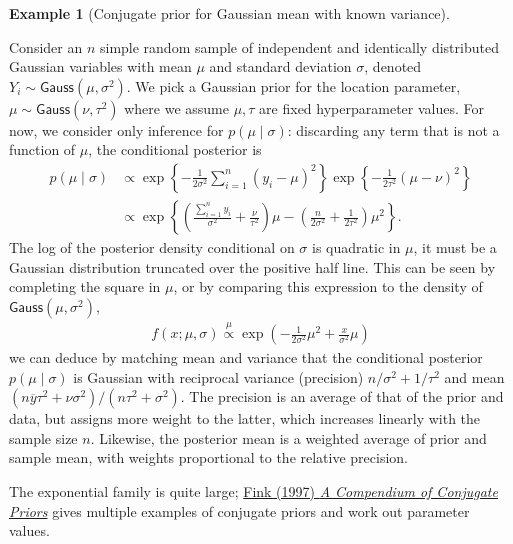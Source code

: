 \documentclass[
  11pt,
  letterpaper,
]{scrbook}
\theoremstyle{definition}
\theoremstyle{definition}
\newtheorem{example}{Example}[chapter]
\theoremstyle{definition}
\theoremstyle{plain}
\theoremstyle{plain}
\theoremstyle{remark}
\begin{document}
\begin{example}[Conjugate prior for Gaussian mean with known
variance]\protect\hypertarget{exm-conjugatepriors-normal}{}\label{exm-conjugatepriors-normal}

Consider an \(n\) simple random sample of independent and identically
distributed Gaussian variables with mean \(\mu\) and standard deviation
\(\sigma\), denoted \(Y_i \sim \mathsf{Gauss}(\mu, \sigma^2)\). We pick
a Gaussian prior for the location parameter,
\(\mu \sim \mathsf{Gauss}(\nu, \tau^2)\) where we assume \(\mu, \tau\)
are fixed hyperparameter values. For now, we consider only inference for
\(p(\mu \mid \sigma)\): discarding any term that is not a function of
\(\mu\), the conditional posterior is \begin{align*}
p(\mu \mid \sigma) &\propto \exp\left\{ -\frac{1}{2\sigma^2}\sum_{i=1}^n (y_{i}-\mu)^2\right\} \exp\left\{-\frac{1}{2\tau^2}(\mu - \nu)^2\right\}
\\&\propto \exp\left\{\left(\frac{\sum_{i=1}^n y_{i}}{\sigma^2} + \frac{\nu}{\tau^2}\right)\mu - \left( \frac{n}{2\sigma^2} +\frac{1}{2\tau^2}\right)\mu^2\right\}.
\end{align*} The log of the posterior density conditional on \(\sigma\)
is quadratic in \(\mu\), it must be a Gaussian distribution truncated
over the positive half line. This can be seen by completing the square
in \(\mu\), or by comparing this expression to the density of
\(\mathsf{Gauss}(\mu, \sigma^2)\), \begin{align*}
f(x; \mu, \sigma) \stackrel{\mu}{\propto} \exp\left(-\frac{1}{2 \sigma^2}\mu^2 + \frac{x}{\sigma^2}\mu\right)
\end{align*} we can deduce by matching mean and variance that the
conditional posterior \(p(\mu \mid \sigma)\) is Gaussian with reciprocal
variance (precision) \(n/\sigma^2 + 1/\tau^2\) and mean
\((n\overline{y}\tau^2 + \nu \sigma^2)/(n\tau^2 + \sigma^2)\). The
precision is an average of that of the prior and data, but assigns more
weight to the latter, which increases linearly with the sample size
\(n\). Likewise, the posterior mean is a weighted average of prior and
sample mean, with weights proportional to the relative precision.

\end{example}

The exponential family is quite large;
\href{https://citeseerx.ist.psu.edu/doc/10.1.1.157.5540}{Fink (1997)
\emph{A Compendium of Conjugate Priors}} gives multiple examples of
conjugate priors and work out parameter values.
\end{document}
